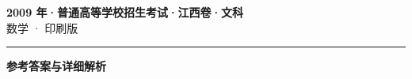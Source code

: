 \documentclass[zihao=5, a4paper]{ctexart}
\begin{document}
\begin{center}
  {\Large\bfseries 2009 年·普通高等学校招生考试·江西卷·文科}\\[4pt]
  {\large 数学 · 印刷版}
\end{center}
\medskip
{}

\par\bigskip\hrule\bigskip
{}
\begin{center}{\large\bfseries 参考答案与详细解析}\end{center}
\smallskip

\end{document}
